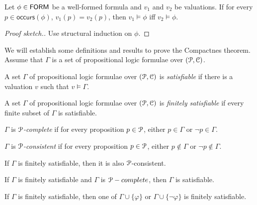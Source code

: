 \documentclass[11pt,usenames, dvipsnames]{article}
\begin{document}
\begin{lemma}
  Let $\phi \in \mathsf{FORM}$ be a well-formed formula and $v_1$ and $v_2$ be valuations. If for every $p \in \mathsf{occurs}(\phi)$, $v_1(p) = v_2(p)$, then $v_1 \models \phi$ iff $v_2 \models \phi$.
\end{lemma}

\begin{proof}[Proof sketch.]
  Use structural induction on $\phi$.
\end{proof}

We will establish some definitions and results to prove the Compactnes theorem. Assume that $\Gamma$ is a set of propositional logic formulae over $(\props, \conn)$.

\begin{definition}[Satisfiability]
  A set $\Gamma$ of propositional logic formulae over $(\props, \conn)$ is \emph{satisfiable} if there is a valuation $v$ such that $v \models \Gamma$.
\end{definition}

\begin{definition}
  A set $\Gamma$ of propositional logic formulae over $(\props, \conn)$ is \emph{finitely satisfiable} if every finite subset of $\Gamma$ is satisfiable.
\end{definition}

\begin{definition}
  $\Gamma$ is \emph{$\props$-complete} if for every proposition $p \in \props$, either $p \in \Gamma$ or $\neg p \in \Gamma$.
\end{definition}

\begin{definition}
  $\Gamma$ is \emph{$\props$-consistent} if for every proposition $p \in \props$, either $p \not\in \Gamma$ or $\neg p \not\in \Gamma$.
\end{definition}

\begin{lemma}
  If $\Gamma$ is finitely satisfiable, then it is also $\props$-consistent.
\end{lemma}

\begin{lemma}
  If $\Gamma$ is finitely satisfiable and $\Gamma$ is $\props-complete$, then $\Gamma$ is satisfiable.
\end{lemma}

\begin{lemma}
  If $\Gamma$ is finitely satisfiable, then one of $\Gamma \cup \{\varphi\}$ or $\Gamma \cup \{\neg\varphi\}$ is finitely satisfiable.
\end{lemma}
\end{document}
